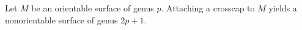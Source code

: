 Let $M$ be an orientable surface of genus $p$. Attaching a crosscap to $M$ yields a nonorientable surface of genus $2p + 1$.
